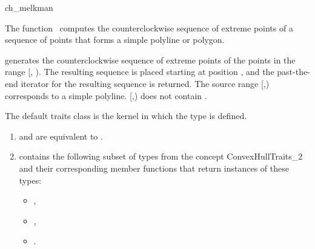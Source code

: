

\begin{ccRefFunction}{ch_melkman}  %

\ccDefinition
  
The function \ccRefName\ computes the counterclockwise sequence of
extreme points of a sequence of points that forms a simple polyline or polygon.


            {generates the counterclockwise sequence of extreme points
            of the points in the range [, ). 
            The resulting sequence is placed starting at
            position , and the past-the-end iterator for
            the resulting sequence is returned.
            \ccPrecond %
            The source range [,) corresponds 
            to a simple polyline. 
            [,) does not contain }.

The default traits class  is the kernel in which the
type  is defined.


\begin{enumerate}
   \item    {} and 
            are equivalent to .
   \item    {} contains the following subset of types from
            the concept ConvexHullTraits\_2 and their corresponding member
            functions that return instances of these types:
            \begin{itemize}
                \item {},
                \item {}, 
                \item {}.
            \end{itemize}
\end{enumerate}


\end{ccRefFunction}

